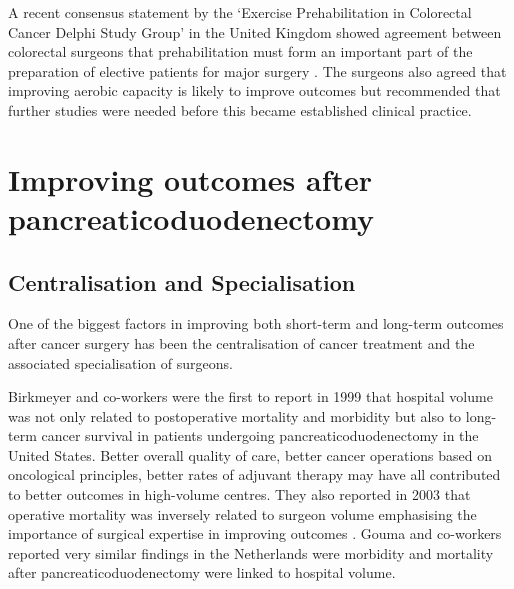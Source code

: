 A recent consensus statement by the `Exercise Prehabilitation in Colorectal Cancer Delphi Study Group' in the United Kingdom showed agreement between colorectal surgeons that prehabilitation must form an important part of the preparation of elective patients for major surgery \parencite{boereboom_forming_2015}. 
The surgeons also agreed that improving aerobic capacity is likely to improve outcomes but recommended that further studies were needed before this became established clinical practice.


\section{Improving outcomes after pancreaticoduodenectomy}

\subsection{Centralisation and Specialisation}

One of the biggest factors in improving both short-term and long-term outcomes after cancer surgery has been the centralisation of cancer treatment and the associated specialisation of surgeons. 

Birkmeyer and co-workers were the first to report in 1999 that hospital volume was not only related to postoperative mortality and morbidity but also to long-term cancer survival in patients undergoing pancreaticoduodenectomy in the United States\parencite{birkmeyer_relationship_1999}.
Better overall quality of care, better cancer operations based on oncological principles, better rates of adjuvant therapy may have all contributed to better outcomes in high-volume centres. 
They also reported in 2003 that operative mortality was inversely related to surgeon volume emphasising the importance of surgical expertise in improving outcomes \parencite{birkmeyer_surgeon_2003}.
Gouma and co-workers reported very similar findings in the Netherlands were morbidity and mortality after pancreaticoduodenectomy were linked to hospital volume\parencite{gouma_rates_2000}.

